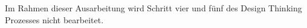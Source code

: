 Im Rahmen dieser Ausarbeitung wird Schritt vier und fünf des Design Thinking Prozesses nicht bearbeitet.\\